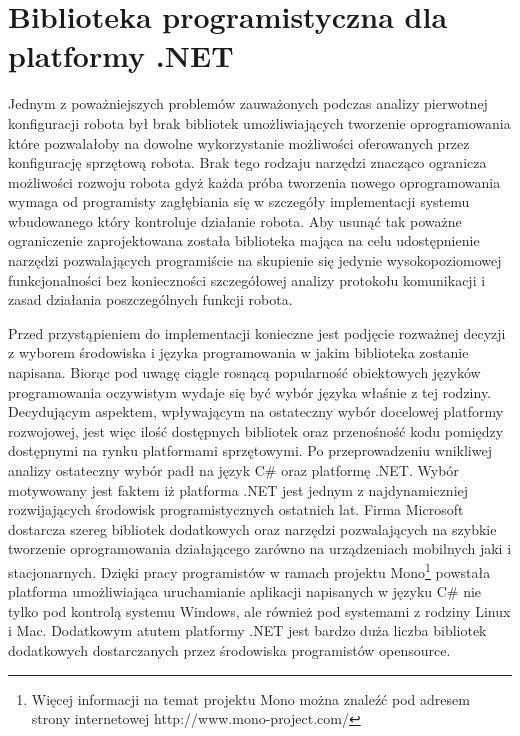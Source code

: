 \section{Biblioteka programistyczna dla platformy .NET}
Jednym z poważniejszych problemów zauważonych podczas analizy pierwotnej
konfiguracji robota był brak bibliotek umożliwiających tworzenie oprogramowania
które pozwalałoby na dowolne wykorzystanie możliwości oferowanych przez
konfigurację sprzętową robota. Brak tego rodzaju narzędzi znacząco ogranicza
możliwości rozwoju robota gdyż każda próba tworzenia nowego oprogramowania wymaga
od programisty zagłębiania się w szczegóły implementacji systemu wbudowanego
który kontroluje działanie robota. Aby usunąć tak poważne ograniczenie
zaprojektowana została biblioteka mająca na celu udostępnienie narzędzi
pozwalających programiście na skupienie się jedynie wysokopoziomowej
funkcjonalności bez konieczności szczegółowej analizy protokołu komunikacji i
zasad działania poszczególnych funkcji robota.

Przed przystąpieniem do implementacji konieczne jest podjęcie rozważnej decyzji z
wyborem środowiska i języka programowania w jakim biblioteka zostanie napisana.
Biorąc pod uwagę ciągle rosnącą popularność obiektowych języków programowania
oczywistym wydaje się być wybór języka właśnie z tej rodziny. Decydującym
aspektem, wpływającym na ostateczny wybór docelowej platformy rozwojowej, jest
więc ilość dostępnych bibliotek oraz przenośność kodu pomiędzy dostępnymi na
rynku platformami sprzętowymi. Po przeprowadzeniu wnikliwej analizy ostateczny
wybór padł na język C\# oraz platformę .NET. Wybór motywowany jest faktem iż
platforma .NET jest jednym z najdynamiczniej rozwijających środowisk
programistycznych ostatnich lat. Firma Microsoft dostarcza szereg bibliotek
dodatkowych oraz narzędzi pozwalających na szybkie tworzenie oprogramowania
działającego zarówno na urządzeniach mobilnych jaki i stacjonarnych. Dzięki
pracy programistów w ramach projektu Mono\footnote{Więcej informacji na temat projektu
Mono można znaleźć pod adresem strony internetowej http://www.mono-project.com/}
powstała platforma umożliwiająca uruchamianie aplikacji napisanych w języku C\#
nie tylko pod kontrolą systemu Windows, ale również pod systemami z rodziny Linux
i Mac. Dodatkowym atutem platformy .NET jest bardzo duża liczba bibliotek
dodatkowych dostarczanych przez środowiska programistów opensource.

